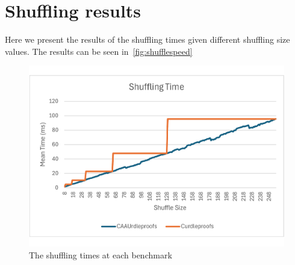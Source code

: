 \clearpage
\section{Shuffling results}\label{sec:shuffling-results}
Here we present the results of the shuffling times given different shuffling size values.
The results can be seen in~\autoref{fig:shufflespeed}
\begin{figure}[!htb]
    \includegraphics[width=0.99\columnwidth]{figures/results/shufflingtime}
    \caption{The shuffling times at each benchmark}%
    \label{fig:shufflespeed}%
\end{figure}
